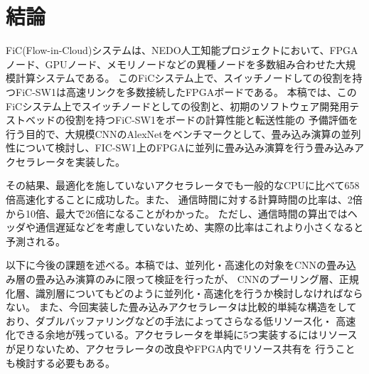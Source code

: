 \chapter{結論}
FiC(Flow-in-Cloud)システムは、NEDO人工知能プロジェクトにおいて、FPGAノード、GPUノード、メモリノードなどの異種ノードを多数組み合わせた大規模計算システムである。
このFiCシステム上で、スイッチノードしての役割を持つFiC-SW1は高速リンクを多数接続したFPGAボードである。
本稿では、このFiCシステム上でスイッチノードとしての役割と、初期のソフトウェア開発用テストベッドの役割を持つFiC-SW1をボードの計算性能と転送性能の
予備評価を行う目的で、大規模CNNのAlexNetをベンチマークとして、畳み込み演算の並列性について検討し、FIC-SW1上のFPGAに並列に畳み込み演算を行う畳み込みアクセラレータを実装した。

その結果、最適化を施していないアクセラレータでも一般的なCPUに比べて658倍高速化することに成功した。また、
通信時間に対する計算時間の比率は、2倍から10倍、最大で26倍になることがわかった。
ただし、通信時間の算出ではヘッダや通信遅延などを考慮していないため、実際の比率はこれより小さくなると予測される。

以下に今後の課題を述べる。本稿では、並列化・高速化の対象をCNNの畳み込み層の畳み込み演算のみに限って検証を行ったが、
CNNのプーリング層、正規化層、識別層についてもどのように並列化・高速化を行うか検討しなければならない。
また、今回実装した畳み込みアクセラレータは比較的単純な構造をしており、ダブルバッファリングなどの手法によってさらなる低リソース化・
高速化できる余地が残っている。アクセラレータを単純に5つ実装するにはリソースが足りないため、アクセラレータの改良やFPGA内でリソース共有を
行うことも検討する必要もある。
